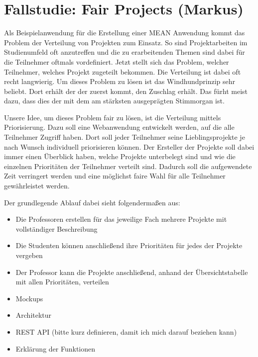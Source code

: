 \section{Fallstudie: Fair Projects (Markus)}
\label{fallstudie-fair-projects}

Als Beispielanwendung für die Erstellung einer MEAN Anwendung kommt das Problem der Verteilung von Projekten zum Einsatz.
So sind Projektarbeiten im Studienumfeld oft anzutreffen und die zu erarbeitenden Themen sind dabei für die Teilnehmer oftmals vordefiniert.
Jetzt stellt sich das Problem, welcher Teilnehmer, welches Projekt zugeteilt bekommen.
Die Verteilung ist dabei oft recht langwierig.
Um dieses Problem zu lösen ist das Windhundprinzip sehr beliebt. Dort erhält der der zuerst kommt, den Zuschlag erhält.
Das fürht meist dazu, dass dies der mit dem am stärksten ausgeprägten Stimmorgan ist. 

Unsere Idee, um dieses Problem fair zu lösen, ist die Verteilung mittels Priorisierung.
Dazu soll eine Webanwendung entwickelt werden, auf die alle Teilnehmer Zugriff haben. 
Dort soll jeder Teilnehmer seine Lieblingsprojekte je nach Wunsch individuell priorisieren können.
Der Ersteller der Projekte soll dabei immer einen Überblick haben, welche Projekte unterbelegt sind und wie die einzelnen Prioritäten der Teilnehmer verteilt sind.
Dadurch soll die aufgewendete Zeit verringert werden und eine möglichst faire Wahl für alle Teilnehmer gewährleistet werden.

Der grundlegende Ablauf dabei sieht folgendermaßen aus:
\begin{itemize}
	\item Die Professoren erstellen für das jeweilige Fach mehrere Projekte mit vollständiger Beschreibung
	\item Die Studenten können anschließend ihre Prioritäten für jedes der Projekte vergeben
	\item Der Professor kann die Projekte anschließend, anhand der Übersichtstabelle mit allen Prioritäten, verteilen
\end{itemize}
\begin{itemize}
	\item Mockups
	\item Architektur
	\item REST API (bitte kurz definieren, damit ich mich darauf beziehen kann)
	\item Erklärung der Funktionen
\end{itemize}